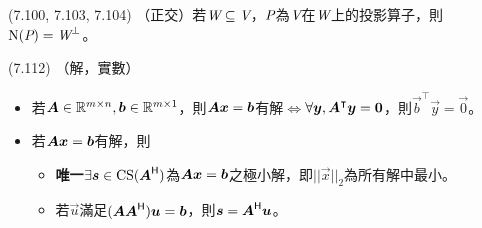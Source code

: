 \item \begin{theorem}{(7.100, 7.103, 7.104)} （正交）若$\spc{W} \subseteq \V$，$\P$為$\V$在$\spc{W}$上的投影算子，則$\Ker(\P) = \spc{W}^{\perp}$。
\end{theorem}

\item \begin{theorem}{(7.112)} （解，實數）
	\begin{itemize}
		\item 若$\mat{A} \in \R^{m \times n}, \vec{b} \in \R^{m \times 1}$，則$\mat{A}\vec{x} = \vec{b}$有解$\iff$$\forall \vec{y}, \mat{A}^\intercal\vec{y} = \vec{0}$，則$\vec{b}^\intercal\vec{y} = \vec{0}$。
		\item 若$\mat{A}\vec{x} = \vec{b}$有解，則
			\begin{itemize}
				\item \textbf{唯一}$\exists \vec{s} \in \cs(\mat{A}\herm)$為$\mat{A}\vec{x} = \vec{b}$之極小解，即$||\vec{x}||_2$為所有解中最小。
				\item 若$\vec{u}$滿足$(\mat{AA}\herm)\vec{u} = \vec{b}$，則$\vec{s} = \mat{A}\herm\vec{u}$。
			\end{itemize}
	\end{itemize}
\end{theorem}
